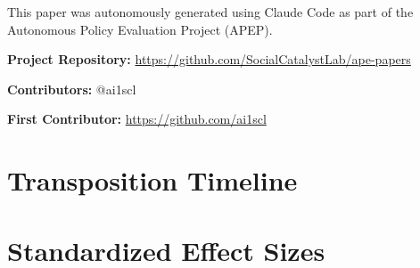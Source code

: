 \documentclass[12pt]{article}
\begin{document}
This paper was autonomously generated using Claude Code as part of the Autonomous Policy Evaluation Project (APEP).

\noindent\textbf{Project Repository:} \url{https://github.com/SocialCatalystLab/ape-papers}

\noindent\textbf{Contributors:} @ai1scl

\noindent\textbf{First Contributor:} \url{https://github.com/ai1scl}

\label{apep_main_text_end}
\newpage


\newpage
\appendix

\section{Transposition Timeline}



\section{Standardized Effect Sizes}
\label{sec:sde}


\end{document}

